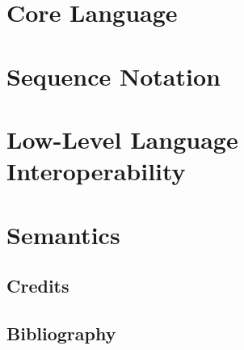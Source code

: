 \documentclass[11pt]{book}
\begin{document}
\mainmatter

\part{Core Language}


\part{Sequence Notation}


\part{Low-Level Language Interoperability}


\part{Semantics}


\appendix

\stopcontents

\chapter*{Credits}\label{cha:credits}


\chapter*{Bibliography}
\printbibliography[heading=bibempty]
\end{document}

